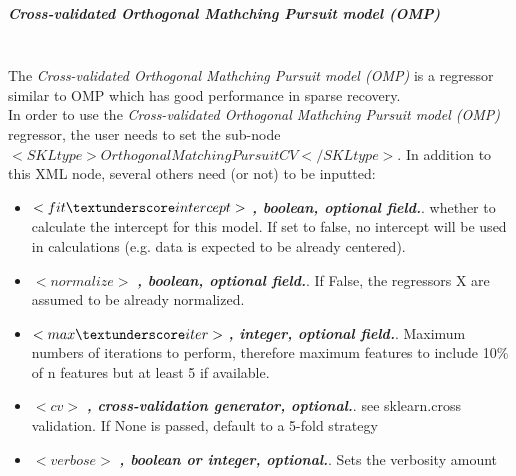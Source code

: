 \subparagraph{Cross-validated Orthogonal Mathching Pursuit model (OMP)}
\mbox{}
\\The \textit{Cross-validated Orthogonal Mathching Pursuit model (OMP)} is a regressor similar to OMP which has good performance in sparse recovery.
\\In order to use the \textit{Cross-validated Orthogonal Mathching Pursuit model (OMP)} regressor, the user needs to set the sub-node $<SKLtype>OrthogonalMatchingPursuitCV</SKLtype>$.
In addition to this XML node, several others need (or not) to be inputted:
\begin{itemize}
  \item $<fit \textunderscore intercept>$ \textbf{\textit{, boolean, optional field.}}. whether to calculate the intercept for this model. If set to false, no intercept will be used in calculations (e.g. data is expected to be already centered).
  \item $<normalize>$ \textbf{\textit{, boolean, optional field.}}. If False, the regressors X are assumed to be already normalized.
  \item $<max \textunderscore iter>$ \textbf{\textit{, integer, optional field.}}. Maximum numbers of iterations to perform, therefore maximum features to include 10\% of n \textunderscore features but at least 5 if available.
  \item $<cv>$ \textbf{\textit{, cross-validation generator, optional.}}. see sklearn.cross \textunderscore validation. If None is passed, default to a 5-fold strategy
  \item $<verbose>$ \textbf{\textit{,  boolean or integer, optional.}}. Sets the verbosity amount
\end{itemize}

